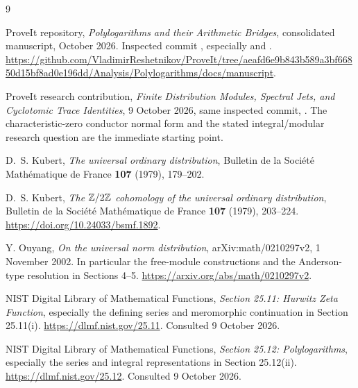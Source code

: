 \begin{thebibliography}{9}

ProveIt repository,
\emph{Polylogarithms and their Arithmetic Bridges}, consolidated manuscript,
October 2026. Inspected commit
, especially
 and
.
\url{https://github.com/VladimirReshetnikov/ProveIt/tree/aeafd6e9b843b589a3bf66850d15bf8ad0e196dd/Analysis/Polylogarithms/docs/manuscript}.

ProveIt research contribution,
\emph{Finite Distribution Modules, Spectral Jets, and Cyclotomic Trace
Identities}, 9 October 2026, same inspected commit,
.
The characteristic-zero conductor normal form and the stated
integral/modular research question are the immediate starting point.

D.~S. Kubert,
\emph{The universal ordinary distribution},
Bulletin de la Soci\'et\'e Math\'ematique de France \textbf{107}
(1979), 179--202.

D.~S. Kubert,
\emph{The $\mathbb Z/2\mathbb Z$ cohomology of the universal ordinary distribution},
Bulletin de la Soci\'et\'e Math\'ematique de France \textbf{107}
(1979), 203--224.
\url{https://doi.org/10.24033/bsmf.1892}.

Y. Ouyang,
\emph{On the universal norm distribution},
arXiv:math/0210297v2, 1 November 2002. In particular the free-module
constructions and the Anderson-type resolution in Sections 4--5.
\url{https://arxiv.org/abs/math/0210297v2}.

NIST Digital Library of Mathematical Functions,
\emph{Section 25.11: Hurwitz Zeta Function}, especially the defining
series and meromorphic continuation in Section 25.11(i).
\url{https://dlmf.nist.gov/25.11}. Consulted 9 October 2026.

NIST Digital Library of Mathematical Functions,
\emph{Section 25.12: Polylogarithms}, especially the series and
integral representations in Section 25.12(ii).
\url{https://dlmf.nist.gov/25.12}. Consulted 9 October 2026.
\end{thebibliography}
